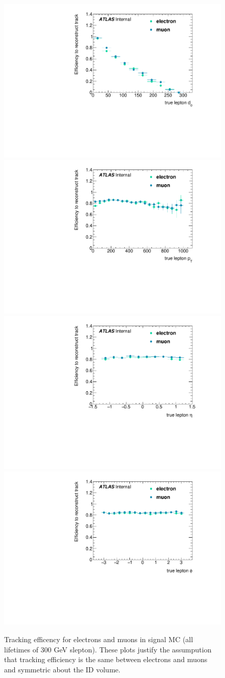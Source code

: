 \begin{figure}[htbp]
\centering
\includegraphics[width=.48\textwidth]{figures/LRT_systs/stlrt_compare_elmu_d0.pdf}
\includegraphics[width=.48\textwidth]{figures/LRT_systs/stlrt_compare_elmu_pt.pdf}
\includegraphics[width=.48\textwidth]{figures/LRT_systs/stlrt_compare_elmu_eta.pdf}
\includegraphics[width=.48\textwidth]{figures/LRT_systs/stlrt_compare_elmu_phi.pdf}
\caption{Tracking efficency for electrons and muons in signal MC (all lifetimes of 300 GeV slepton). These plots justify the assumpution that tracking efficiency is the same between electrons and muons and symmetric about the ID volume.}
\label{fig:trk_el_mu}
\end{figure}

